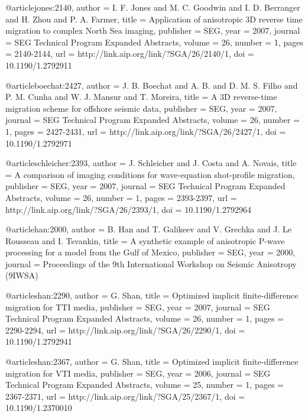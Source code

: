 @article{jones:2140,
  author =	 {I. F. Jones and M. C. Goodwin and I. D. Berranger
                  and H. Zhou and P. A. Farmer},
  title =	 {Application of anisotropic {3D} reverse time
                  migration to complex {N}orth {S}ea imaging},
  publisher =	 {SEG},
  year =	 2007,
  journal =	 {SEG Technical Program Expanded Abstracts},
  volume =	 26,
  number =	 1,
  pages =	 {2140-2144},
  url =		 {http://link.aip.org/link/?SGA/26/2140/1},
  doi =		 {10.1190/1.2792911}
}

@article{boechat:2427,
  author =	 {J. B. Boechat and A. B.
                  and D. M. S. Filho and P. M. Cunha and
                  W. J. Mansur and T. Moreira},
  title =	 {A {3D} reverse-time migration scheme for offshore
                  seismic data},
  publisher =	 {SEG},
  year =	 2007,
  journal =	 {SEG Technical Program Expanded Abstracts},
  volume =	 26,
  number =	 1,
  pages =	 {2427-2431},
  url =		 {http://link.aip.org/link/?SGA/26/2427/1},
  doi =		 {10.1190/1.2792971}
}

@article{schleicher:2393,
  author =	 {J. Schleicher and J. Costa and
                  A. Novais},
  title =	 {A comparison of imaging conditions for wave-equation
                  shot-profile migration},
  publisher =	 {SEG},
  year =	 2007,
  journal =	 {SEG Technical Program Expanded Abstracts},
  volume =	 26,
  number =	 1,
  pages =	 {2393-2397},
  url =		 {http://link.aip.org/link/?SGA/26/2393/1},
  doi =		 {10.1190/1.2792964}
}

@article{han:2000,
  author =	 {B. Han and T. Galikeev and V. Grechka
                  and J. Le Rousseau and I. Tsvankin},
  title =	 {A synthetic example of anisotropic {P}-wave
                  processing for a model from the {G}ulf of {M}exico},
  publisher =	 {SEG},
  year =	 2000,
  journal =	 {Proceedings of the 9th International Workshop on
                  Seismic Anisotropy (9IWSA)}
}

@article{shan:2290,
  author =	 {G. Shan},
  title =	 {Optimized implicit finite-difference migration for
                  {TTI} media},
  publisher =	 {SEG},
  year =	 2007,
  journal =	 {SEG Technical Program Expanded Abstracts},
  volume =	 26,
  number =	 1,
  pages =	 {2290-2294},
  url =		 {http://link.aip.org/link/?SGA/26/2290/1},
  doi =		 {10.1190/1.2792941}
}

@article{shan:2367,
  author =	 {G. Shan},
  title =	 {Optimized implicit finite-difference migration for
                  {VTI} media},
  publisher =	 {SEG},
  year =	 2006,
  journal =	 {SEG Technical Program Expanded Abstracts},
  volume =	 25,
  number =	 1,
  pages =	 {2367-2371},
  url =		 {http://link.aip.org/link/?SGA/25/2367/1},
  doi =		 {10.1190/1.2370010}
}

